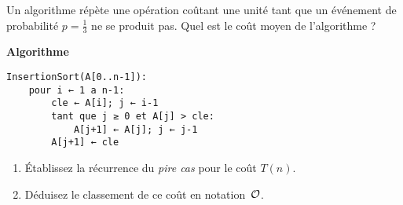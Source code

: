 \begin{exercice}
Un algorithme répète une opération coûtant une unité tant que
un événement de probabilité \(p=\tfrac13\) ne se produit pas.
Quel est le coût moyen de l’algorithme ?  %
\end{exercice}


\begin{exercice}
\textbf{Algorithme}\\[-1.1em]
\begin{lstlisting}
InsertionSort(A[0..n-1]):
    pour i ← 1 a n-1:
        cle ← A[i]; j ← i-1
        tant que j ≥ 0 et A[j] > cle:
            A[j+1] ← A[j]; j ← j-1
        A[j+1] ← cle
\end{lstlisting}

\begin{enumerate}[label=\alph*)]
  \item Établissez la récurrence du \emph{pire cas} pour le coût $T(n)$.
  \item Déduisez le classement de ce coût en notation~$\mathcal{O}$.
\end{enumerate} %
\end{exercice}



